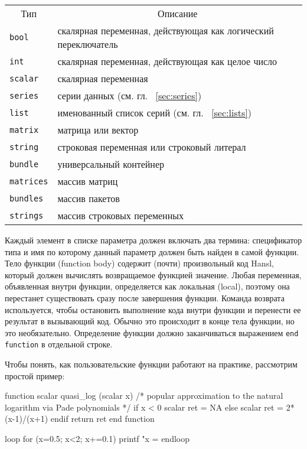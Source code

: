\begin{center}
\begin{tabular}{ll}
  \multicolumn{1}{c}{Тип} & 
  \multicolumn{1}{c}{Описание} \\ [4pt]
  \texttt{bool}   & скалярная переменная, действующая как логический переключатель \\
  \texttt{int}    & скалярная переменная, действующая как целое число  \\
  \texttt{scalar} & скалярная переменная\\
  \texttt{series} & серии данных (см. гл. ~\ref{sec:series})\\
  \texttt{list}   & именованный список серий (см. гл. ~\ref{sec:lists})\\
  \texttt{matrix} & матрица или вектор \\
  \texttt{string} & строковая переменная или строковый литерал \\
  \texttt{bundle} & универсальный контейнер \\
  \texttt{matrices} & массив матриц \\
  \texttt{bundles}  & массив пакетов \\
  \texttt{strings}  & массив строковых переменных
\end{tabular}
\end{center}
Каждый элемент в списке параметра должен включать два термина:
спецификатор типа и имя по которому данный параметр должен быть найден
в самой функции.  Тело функции (function body) содержит (почти)
произвольный код Hansl, который должен вычислять возвращаемое функцией
значение. Любая переменная, объявленная внутри функции, определяется
как локальная (local), поэтому она перестанет существовать сразу после
завершения функции.  Команда возврата  используется, чтобы
остановить выполнение кода внутри функции и перенести ее результат в
вызывающий код. Обычно это происходит в конце тела функции, но это
необязательно. Определение функции должно заканчиваться выражением
\verb|end function| в отдельной строке.


Чтобы понять, как пользовательские функции работают на практике,
рассмотрим простой пример:
\begin{code}
function scalar quasi_log (scalar x)
   /* popular approximation to the natural logarithm
     via Pade polynomials 
   */
   if x < 0
      scalar ret = NA
   else 
      scalar ret = 2*(x-1)/(x+1)
   endif
   return ret
end function

loop for (x=0.5; x<2; x+=0.1)
   printf "x = %
endloop
\end{code}


